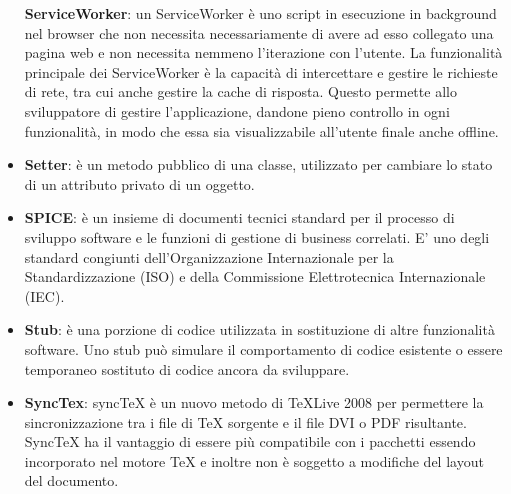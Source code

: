 \begin{itemize}
	\textbf{ServiceWorker}: un ServiceWorker è uno script in esecuzione in background nel browser che non necessita necessariamente di avere ad esso collegato una pagina web e non necessita nemmeno l’iterazione con l’utente. La funzionalità principale dei ServiceWorker è la capacità di intercettare e gestire le richieste di rete, tra cui anche gestire la cache di risposta. Questo permette allo sviluppatore di gestire l’applicazione, dandone pieno controllo in ogni funzionalità, in modo che essa sia visualizzabile all’utente finale anche offline.
	\item
	\textbf{Setter}: è un metodo pubblico di una classe, utilizzato per cambiare lo stato di un attributo privato di un oggetto.
	\item 
	\textbf{SPICE}: è un insieme di documenti tecnici standard per il processo di sviluppo software e le funzioni di gestione di business correlati. E' uno degli standard congiunti dell'Organizzazione Internazionale per la Standardizzazione (ISO) e della Commissione Elettrotecnica Internazionale (IEC).
	\item
	\textbf{Stub}:  è una porzione di codice utilizzata in sostituzione di altre funzionalità software. Uno stub può simulare il comportamento di codice esistente o essere temporaneo sostituto di codice ancora da sviluppare. 
	\item
	\textbf{SyncTex}: syncTeX è un nuovo metodo di TeXLive 2008 per permettere la sincronizzazione tra i file di TeX sorgente e il file DVI o PDF risultante. SyncTeX ha il vantaggio di essere più compatibile con i pacchetti essendo incorporato nel motore TeX e inoltre non è soggetto a modifiche del layout del documento.
\end{itemize}